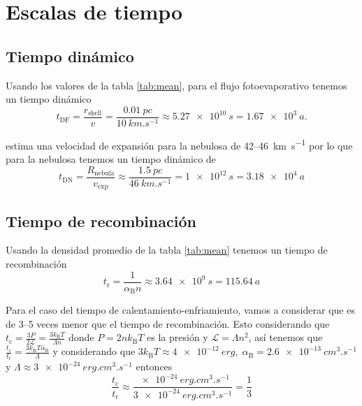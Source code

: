 \documentclass{book}
\begin{document}
\chapter{Escalas de tiempo}

\section{Tiempo dinámico}

Usando los valores de la tabla \ref{tab:mean}, para el flujo fotoevaporativo tenemos un tiempo dinámico 
\begin{equation}
t_\mathrm{DF} = \frac{r_\mathrm{shell}}{v} = \frac{\SI{0.01}{pc}}{\SI{10}{km.s^{-1}}}\approx \SI{5.27e10}{s}  = \SI{1.67e3}{a}.
\end{equation}

\cite{Mancherko:2010} estima una velocidad de expansión para la nebulosa de 42--\SI{46}{km.s^{-1}} por lo que para la nebulosa tenemos un tiempo dinámico de 
\begin{equation}
t_\mathrm{DN}= \frac{R_\mathrm{nebula}}{v_\mathrm{exp}}\approx\frac{\SI{1.5}{pc}}{\SI{46}{km.s^{-1}}}= \SI{1e12}{s}=\SI{3.18e4}{a}
\end{equation}

\section{Tiempo de recombinación}

Usando la densidad promedio de la tabla \ref{tab:mean} tenemos un tiempo de recombinación 
\begin{equation}
t_\mathrm{r} = \frac{1}{\alpha_\mathrm{B} n} \approx \SI{3.64e9}{s}= \SI{115.64}{a}
\end{equation}

Para el caso del tiempo de calentamiento-enfriamiento, vamos a considerar que es de 3--5 veces menor que el tiempo de recombinación. Esto considerando que $t_\mathrm{c}=\frac{3P}{2\mathcal{L}}=\frac{3k_\mathrm{B}T}{\Lambda n}$ donde $P=2nk_\mathrm{B}T$ es la presión y $\mathcal{L}=\Lambda n^2$, así tenemos que $\frac{t_\mathrm{c}}{t_\mathrm{r}}=\frac{3k_\mathrm{B}T\alpha_\mathrm{B}}{\Lambda}$ y considerando que $3k_\mathrm{B}T\approx\SI{4e-12}{erg},\; \alpha_\mathrm{B}=\SI{2.6e-13}{cm^3.s^{-1}}$ y $\Lambda\approx\SI{3e-24}{erg.cm^3.s^{-1}}$ entonces
\begin{equation}
    \frac{t_\mathrm{c}}{t_\mathrm{r}}\approx\frac{\SI{e-24}{erg.cm^3.s^{-1}}}{\SI{3e-24}{erg.cm^3.s^{-1}}}=\frac{1}{3}
\end{equation}
\end{document}
